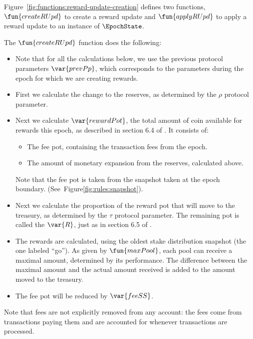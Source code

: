 \clearpage

Figure~\ref{fig:functions:reward-update-creation} defines two functions,
$\fun{createRUpd}$ to create a reward update and $\fun{applyRUpd}$ to apply a
reward update to an instance of $\EpochState$.

The $\fun{createRUpd}$ function does the following:
\begin{itemize}
  \item Note that for all the calculations below, we use the previous protocol parameters
    $\var{prevPp}$, which corresponds to the parameters during the epoch for which we
    are creating rewards.
  \item First we calculate the change to the reserves,
    as determined by the $\rho$ protocol parameter.
  \item Next we calculate $\var{rewardPot}$, the total amount of coin available for rewards this
    epoch, as described in section 6.4 of \cite{delegation_design}. It consists of:
    \begin{itemize}
      \item The fee pot, containing the transaction fees from the epoch.
      \item The amount of monetary expansion from the reserves, calculated above.
    \end{itemize}
    Note that the fee pot is taken from the snapshot taken at the epoch boundary.
    (See~Figure\ref{fig:rules:snapshot}).
  \item Next we calculate the proportion of the reward pot that will move to the treasury,
    as determined by the $\tau$ protocol parameter. The remaining pot is called the
    $\var{R}$, just as in section 6.5 of \cite{delegation_design}.
  \item The rewards are calculated, using the oldest stake distribution snapshot (the one
    labeled ``go'').
    As given by $\fun{maxPool}$, each pool can receive a maximal amount, determined by its
    performance.  The difference between the maximal amount and the actual amount received is
    added to the amount moved to the treasury.
  \item The fee pot will be reduced by $\var{feeSS}$.
\end{itemize}

Note that fees are not explicitly removed from any account:
the fees come from transactions paying them and are accounted for whenever
transactions are processed.

